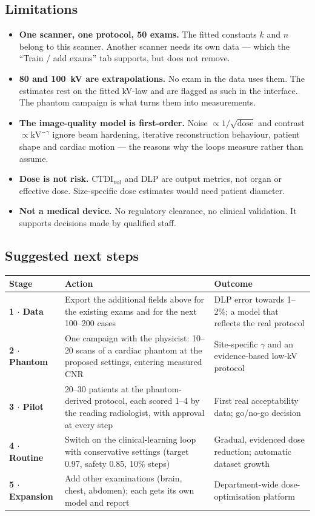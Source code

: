 \documentclass[10pt,a4paper]{article}
\newcommand{\ctdi}{\ensuremath{\mathrm{CTDI}_{\mathrm{vol}}}}
\newcommand{\hdr}{\rowcolor{ctsurf}}
\begin{document}
\subsection{Limitations}
\begin{itemize}
\item \textbf{One scanner, one protocol, 50 exams.} The fitted constants $k$ and $n$ belong to this scanner.
Another scanner needs its own data --- which the ``Train / add exams'' tab supports, but does not remove.
\item \textbf{80 and 100~kV are extrapolations.} No exam in the data uses them. The estimates rest on the fitted
kV-law and are flagged as such in the interface. The phantom campaign is what turns them into measurements.
\item \textbf{The image-quality model is first-order.} Noise $\propto 1/\sqrt{\text{dose}}$ and contrast $\propto
\mathrm{kV}^{-\gamma}$ ignore beam hardening, iterative reconstruction behaviour, patient shape and cardiac motion
--- the reasons why the loops measure rather than assume.
\item \textbf{Dose is not risk.} \ctdi{} and DLP are output metrics, not organ or effective dose. Size-specific
dose estimates would need patient diameter.
\item \textbf{Not a medical device.} No regulatory clearance, no clinical validation. It supports decisions made by
qualified staff.
\end{itemize}

\subsection{Suggested next steps}
\begin{table}[h]\footnotesize
\begin{tabularx}{\linewidth}{@{}l L L@{}}
\toprule
\hdr \textbf{Stage} & \textbf{Action} & \textbf{Outcome}\\
\midrule
\textbf{1 $\cdot$ Data} & Export the additional fields above for the existing exams and for the next 100--200 cases & DLP error towards 1--2\%; a model that reflects the real protocol\\
\textbf{2 $\cdot$ Phantom} & One campaign with the physicist: 10--20 scans of a cardiac phantom at the proposed settings, entering measured CNR & Site-specific $\gamma$ and an evidence-based low-kV protocol\\
\textbf{3 $\cdot$ Pilot} & 20--30 patients at the phantom-derived protocol, each scored 1--4 by the reading radiologist, with approval at every step & First real acceptability data; go/no-go decision\\
\textbf{4 $\cdot$ Routine} & Switch on the clinical-learning loop with conservative settings (target 0.97, safety 0.85, 10\% steps) & Gradual, evidenced dose reduction; automatic dataset growth\\
\textbf{5 $\cdot$ Expansion} & Add other examinations (brain, chest, abdomen); each gets its own model and report & Department-wide dose-optimisation platform\\
\bottomrule
\end{tabularx}
\end{table}
\end{document}
